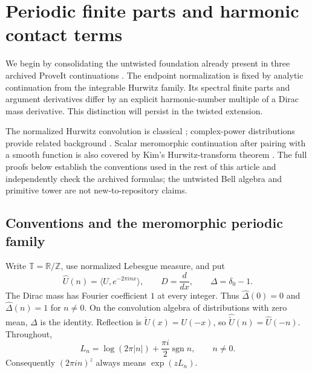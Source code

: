 \section{Periodic finite parts and harmonic contact terms}
\label{per:sec:main}

We begin by consolidating the untwisted foundation already present in
three archived ProveIt continuations
\cite{RepoConvolutionAlgebra,RepoConvolutionCalculus,RepoShiftedJets}.
The endpoint normalization is fixed by analytic continuation from the
integrable Hurwitz family. Its spectral finite parts and argument
derivatives differ by an explicit harmonic-number multiple of a Dirac
mass derivative. This distinction will persist in the twisted extension.

The normalized Hurwitz convolution is classical
\cite[Remark 3.2]{per:Sun}; complex-power distributions provide related
background \cite[Section 5]{per:GaySebbar}. Scalar meromorphic
continuation after pairing with a smooth function is also covered by
Kim's Hurwitz-transform theorem
\cite[Theorem 1 and Corollary 2]{Kim2026}. The full proofs below establish
the conventions used in the rest of this article and independently check
the archived formulas; the untwisted Bell algebra and primitive tower are
not new-to-repository claims.

\subsection{Conventions and the meromorphic periodic family}

Write $\mathbb T=\mathbb R/\mathbb Z$, use normalized Lebesgue measure,
and put
\[
 \widehat U(n)=\langle U,e^{-2\pi i n x}\rangle,\qquad
 D=\frac{d}{dx},\qquad \Delta=\delta_0-1.
\]
The Dirac mass has Fourier coefficient $1$ at every integer. Thus
$\widehat\Delta(0)=0$ and $\widehat\Delta(n)=1$ for $n\ne0$.
On the convolution algebra of distributions with zero mean, $\Delta$
is the identity. Reflection is $\check U(x)=U(-x)$, so
$\widehat{\check U}(n)=\widehat U(-n)$. Throughout,
\begin{equation}\label{per:eq:L}
 L_n=\log(2\pi |n|)+\frac{\pi i}{2}\operatorname{sgn}n,
 \qquad n\ne0.
\end{equation}
Consequently $(2\pi i n)^z$ always means $\exp(zL_n)$.

